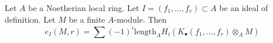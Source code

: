 %
\begin{theorem}
\label{theorem-multiplicity-with-koszul}
\begin{reference}
\cite[Theorem 1 in part B of Chapter IV]{Serre_algebre_locale}
\end{reference}
Let $A$ be a Noetherian local ring. Let $I = (f_1, \ldots, f_r) \subset A$
be an ideal of definition. Let $M$ be a finite $A$-module. Then
$$
e_I(M, r) = \sum
(-1)^i\text{length}_A H_i(K_\bullet(f_1, \ldots, f_r) \otimes_A M)
$$
\end{theorem}

